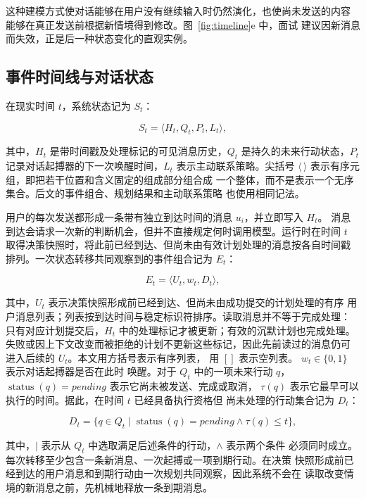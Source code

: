 \documentclass[manuscript,nonacm]{acmart}
\begin{document}
这种建模方式使对话能够在用户没有继续输入时仍然演化，也使尚未发送的内容
能够在真正发送前根据新情境得到修改。图~\ref{fig:timeline}e 中，面试
建议因新消息而失效，正是后一种状态变化的直观实例。

\subsection{事件时间线与对话状态}

在现实时间 $t$，系统状态记为 $S_t$：

\begin{equation}
S_t = \langle H_t,Q_t,P_t,L_t\rangle,
\end{equation}

其中，$H_t$ 是带时间戳及处理标记的可见消息历史，$Q_t$ 是持久的未来行动状态，$P_t$
记录对话起搏器的下一次唤醒时间，$L_t$ 表示主动联系策略。尖括号
$\langle\,\rangle$ 表示有序元组，即把若干位置和含义固定的组成部分组合成
一个整体，而不是表示一个无序集合。后文的事件组合、规划结果和主动联系策略
也使用相同记法。

用户的每次发送都形成一条带有独立到达时间的消息 $u_i$，并立即写入 $H_t$。
消息到达会请求一次新的判断机会，但并不直接规定何时调用模型。运行时在时间
$t$ 取得决策快照时，将此前已经到达、但尚未由有效计划处理的消息按各自时间戳
排列。一次状态转移共同观察到的事件组合记为 $E_t$：

\begin{equation}
E_t=\langle U_t,w_t,D_t\rangle,
\end{equation}

其中，$U_t$ 表示决策快照形成前已经到达、但尚未由成功提交的计划处理的有序
用户消息列表；列表按到达时间与稳定标识符排序。读取消息并不等于完成处理：
只有对应计划提交后，$H_t$ 中的处理标记才被更新；有效的沉默计划也完成处理。
失败或因上下文改变而被拒绝的计划不更新这些标记，因此先前读过的消息仍可
进入后续的 $U_t$。本文用方括号表示有序列表，
用 $[]$ 表示空列表。
$w_t\in\{0,1\}$ 表示对话起搏器是否在此时
唤醒。对于 $Q_t$ 中的一项未来行动 $q$，
$\operatorname{status}(q)=\textit{pending}$ 表示它尚未被发送、完成或取消，
$\tau(q)$ 表示它最早可以执行的时间。据此，在时间 $t$ 已经具备执行资格但
尚未处理的行动集合记为 $D_t$：

\begin{equation}
D_t=\{q\in Q_t\mid \operatorname{status}(q)=\textit{pending}
\land \tau(q)\leq t\},
\end{equation}

其中，$\mid$ 表示从 $Q_t$ 中选取满足后述条件的行动，$\land$ 表示两个条件
必须同时成立。每次转移至少包含一条新消息、一次起搏或一项到期行动。在决策
快照形成前已经到达的用户消息和到期行动由一次规划共同观察，因此系统不会在
读取改变情境的新消息之前，先机械地释放一条到期消息。
\end{document}
